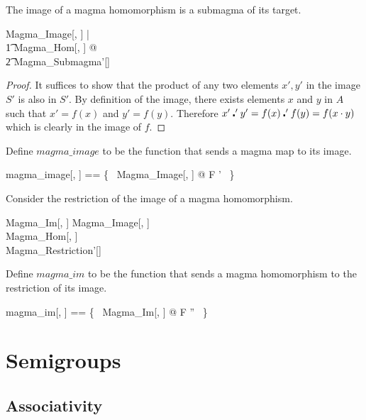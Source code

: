 \documentclass{amsart}
\begin{document}
\begin{remark}
The image of a magma homomorphism is a submagma of its target.

\begin{zed}
	\forall Magma\_Image[\setT, \setU] | \\
	\t1	Magma\_Hom[\setT, \setU] @ \\
	\t2		Magma\_Submagma'[\setU]
\end{zed}

\begin{proof}
It suffices to show that the product of any two elements $x', y'$ in the image $S'$ is 
also in $S'$. By definition of the image, there exists elements $x$ and $y$ in $A$
such that $x' = f(x)$ and $y' = f(y)$.
Therefore $x' \mathbin{\centerdot}' y' = f(x) \mathbin{\centerdot}' f(y) = f(x \mathbin{\cdot} y)$ which is clearly in the image of $f$. 
\end{proof}

\end{remark}

Define $magma\_image$ to be the function that sends a magma map to its image.

\begin{zed}
	magma\_image[\genT, \genU] == \{~ Magma\_Image[\genT, \genU] @ F \mapsto \strucS' ~\}
\end{zed}

Consider the restriction of the image of a magma homomorphism.

\begin{schema}{Magma\_Im}[\genT, \genU]
	Magma\_Image[\genT, \genU] \\
	Magma\_Hom[\genT, \genU] \\
	Magma\_Restriction'[\genU]
\end{schema}

Define $magma\_im$ to be the function that sends a magma homomorphism to the
restriction of its image.

\begin{zed}
	magma\_im[\genT, \genU] == \{~ Magma\_Im[\genT, \genU] @ F \mapsto \strucA'' ~\}
\end{zed}

\section{Semigroups}

\subsection{Associativity}
\end{document}

